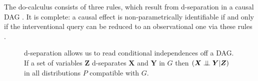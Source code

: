 \documentclass[b0,landscape,25pt]{sciposter}
\begin{document}
\begin{multicols}{5}
The do-calculus consists of three rules, which result from d-separation in a causal DAG \cite{Pearl2000}. It is complete: a causal effect is non-parametrically identifiable if and only if the interventional query can be reduced to an observational one via these rules \cite{Shpitser2008}. 

\begin{figure}
\caption{d-separation allows us to read conditional independences off a DAG. If a set of variables $\boldsymbol{Z}$ d-separates $\boldsymbol{X}$ and $\boldsymbol{Y}$ in $G$ then ${(\boldsymbol{X} \perp\!\!\!\perp \boldsymbol{Y}|\boldsymbol{Z})}$ in all distributions $P$ compatible with $G$. }
\label{fig:dsep}
\centering
{}
\end{figure}


\end{multicols}
\end{document}
